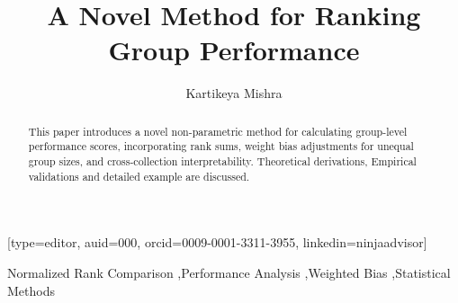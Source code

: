 \documentclass[a4paper,fleqn,review]{cas-sc}
\begin{document}
	
\let\WriteBookmarks\relax
\def\floatpagepagefraction{1}
\def\textpagefraction{.001}

\title [mode = title]{A \textsf{Novel} Method for Ranking Group Performance}            
\tnotemark[1]


\author[1]{Kartikeya Mishra}[type=editor,
auid=000,
orcid=0009-0001-3311-3955,
linkedin=ninjaadvisor]



\credit{}

\begin{abstract}
	This paper introduces a novel non-parametric method for calculating group-level performance scores, incorporating rank sums, weight bias adjustments for unequal group sizes, and cross-collection interpretability. Theoretical derivations, Empirical validations and detailed example are discussed.
\end{abstract}

%

\begin{keywords}
	Normalized Rank Comparison \sep Performance Analysis \sep Weighted Bias  \sep Statistical Methods
\end{keywords}


\maketitle
\end{document}
